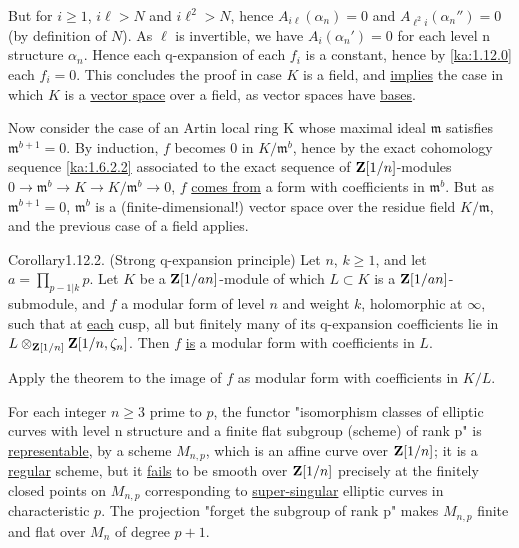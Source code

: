 \begin{kaproof}
But for $i\geq 1$, $i\ell > N$ and $i\ell^2 > N$, hence $A_{i\ell}(\alpha_n) = 0$
and $A_{\ell^2i}(\alpha_n'')=0$ (by definition of $N$). As $\ell$ is
invertible, we have $A_i(\alpha_n') = 0$ for each level n structure $\alpha_n$.
Hence each q-expansion of each $f_i$ is a constant, hence by \eqref{ka:1.12.0} each
$f_i = 0$. This concludes the proof in case $K$ is a field, and \uline{implies}
the case in which $K$ is a \uline{vector space} over a field, as vector spaces
have \uline{bases}.

Now consider the case of an Artin local ring K whose maximal ideal $\mathfrak{m}$
satisfies $\mathfrak{m}^{b+1} = 0$. By induction, $f$ becomes $0$ in $K/\mathfrak{m}^b$, hence by
the exact cohomology sequence \eqref{ka:1.6.2.2} associated to the exact sequence of
$\mathbf{Z}[1/n]$-modules $0\to\mathfrak{m}^b\to K\to K/\mathfrak{m}^b\to 0$, $f$ \uline{comes from} a
form with coefficients in $\mathfrak{m}^b$. But as $\mathfrak{m}^{b+1} = 0$, $\mathfrak{m}^b$ is a
(finite-dimensional!) vector space over the residue field $K/\mathfrak{m}$, and the
previous case of a field applies.
\end{kaproof}

\begin{kathm}{Corollary}{1.12.2.}
(Strong q-expansion principle) Let $n$, $k\geq 1$, and let
$a = \prod_{p-1|k}p$. Let $K$ be a $\mathbf{Z}[1/an]$-module of which $L\subset K$ is a
$\mathbf{Z}[1/an]$-submodule, and $f$ a modular form of level $n$ and weight $k$,
holomorphic at $\infty$, such that at \uline{each} cusp, all but finitely many
of its q-expansion coefficients lie in
$L\otimes_{\mathbf{Z}[1/n]}\mathbf{Z}[1/n,\zeta_n]$. Then $f$ \uline{is} a modular form with
coefficients in $L$.
\end{kathm}

\begin{kaproof}
Apply the theorem to the image of $f$ as modular form with coefficients in
$K/L$.
\end{kaproof}


For each integer $n\geq 3$ prime to $p$, the functor "isomorphism classes of
elliptic curves with level n structure and a finite flat subgroup (scheme) of
rank p" is \uline{representable}, by a scheme $M_{n,p}$, which is an affine
curve over $\mathbf{Z}[1/n]$; it is a \uline{regular} scheme, but it \uline{fails} to
be smooth over $\mathbf{Z}[1/n]$ precisely at the finitely closed points on $M_{n,p}$
corresponding to \uline{super-singular} elliptic curves in characteristic $p$.
The projection "forget the subgroup of rank p" makes $M_{n,p}$ finite and flat
over $M_n$ of degree $p+1$.

